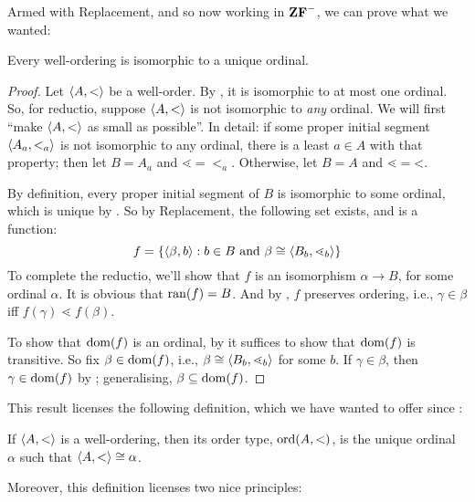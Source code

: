 \documentclass[../../../include/open-logic-section]{subfiles}
\begin{document}

Armed with Replacement, and so now working in $\mathbf{ZF}^{-}$, we can prove
what we wanted:

\begin{thm}
Every well-ordering is isomorphic to a unique ordinal. 
\end{thm}

\begin{proof}
Let $\langle A, < \rangle$ be a well-order. By
, it is isomorphic to at most one
ordinal. So, for reductio, suppose $\langle A, < \rangle$ is not isomorphic to
\emph{any} ordinal. We will first ``make $\langle A, < \rangle$ as small as
possible''. In detail: if some proper initial segment $\langle A_a,
<_a \rangle$ is not isomorphic to any ordinal, there is a least $a \in A$
with that property; then let $B = A_a$ and $\mathord{\lessdot} =
\mathord{<_a}$. Otherwise, let $B = A$ and $\mathord{\lessdot} =
\mathord{<}$. 

By definition, every proper initial segment of $B$ is isomorphic to
some ordinal, which is unique by . So
by Replacement, the following set exists, and is a function:
\[
	f = \{ \langle \beta, b \rangle : b \in B\text{ and }\beta \cong \langle B_b, \lessdot_b \rangle \}
\]
To complete the reductio, we'll show that $f$ is an isomorphism
$\alpha \to B$, for some ordinal $\alpha$. It is obvious that $\mathrm{ran}(f)
= B$. And by , $f$ preserves ordering,
i.e., $\gamma \in \beta$ iff $f(\gamma) \lessdot f(\beta)$. 

To show that $\mathrm{dom}(f)$ is an ordinal, by
 it suffices to show that
$\mathrm{dom}(f)$ is transitive. So fix $\beta \in \mathrm{dom}(f)$, i.e.,
$\beta \cong \langle B_b, \lessdot_b \rangle$ for some $b$. If $\gamma \in
\beta$, then $\gamma \in \mathrm{dom}(f)$ by
; generalising, $\beta \subseteq
\mathrm{dom}(f)$.
\end{proof}

This result licenses the following definition, which we have wanted to
offer since :

\begin{defn}
If $\langle A, < \rangle$ is a well-ordering, then its order type,
$\mathrm{ord}(A, <)$, is the unique ordinal $\alpha$ such that
$\langle A, <  \rangle \cong \alpha$.
\end{defn}

Moreover, this definition licenses two nice principles:
\end{document}
